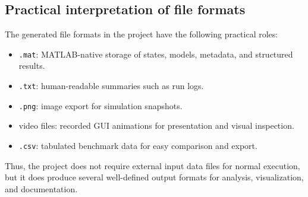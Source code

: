 \subsection*{Practical interpretation of file formats}

The generated file formats in the project have the following practical roles:

\begin{itemize}
    \item \texttt{.mat}: MATLAB-native storage of states, models, metadata, and structured results.
    \item \texttt{.txt}: human-readable summaries such as run logs.
    \item \texttt{.png}: image export for simulation snapshots.
    \item video files: recorded GUI animations for presentation and visual inspection.
    \item \texttt{.csv}: tabulated benchmark data for easy comparison and export.
\end{itemize}

Thus, the project does not require external input data files for normal execution, but it does produce several well-defined output formats for analysis, visualization, and documentation.
